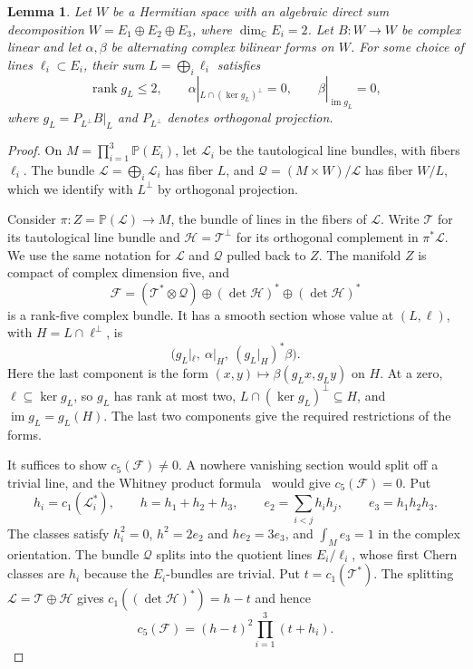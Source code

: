 \documentclass[11pt,letterpaper]{article}
\newtheorem{lemma}[theorem]{Lemma}
\newcommand{\C}{\mathbb C}
\newcommand{\rank}{\operatorname{rank}}
\begin{document}
\begin{lemma}\label{lem:selection}
Let \(W\) be a Hermitian space with an algebraic direct sum
decomposition \(W=E_1\oplus E_2\oplus E_3\), where
\(\dim_{\C}E_i=2\). Let \(B:W\to W\) be complex linear and
let \(\alpha,\beta\) be alternating complex bilinear forms on \(W\).
For some choice of lines \(\ell_i\subset E_i\), their sum
\(L=\bigoplus_i\ell_i\) satisfies
\[
\rank g_L\le2,\qquad
\alpha|_{L\cap(\ker g_L)^\perp}=0,\qquad
\beta|_{\operatorname{im}g_L}=0,
\]
where \(g_L=P_{L^\perp}B|_L\) and \(P_{L^\perp}\) denotes orthogonal
projection.
\end{lemma}

\begin{proof}
On \(M=\prod_{i=1}^3\mathbb P(E_i)\), let \(\mathcal L_i\) be the
tautological line bundles, with fibers \(\ell_i\). The bundle
\(\mathcal L=\bigoplus_i\mathcal L_i\) has fiber \(L\), and
\(\mathcal Q=(M\times W)/\mathcal L\) has fiber \(W/L\), which we
identify with \(L^\perp\) by orthogonal projection.

Consider \(\pi:Z=\mathbb P(\mathcal L)\to M\), the bundle of lines
in the fibers of \(\mathcal L\). Write \(\mathcal T\) for its
tautological line bundle and \(\mathcal H=\mathcal T^\perp\) for its
orthogonal complement in \(\pi^*\mathcal L\). We use the same notation
for \(\mathcal L\) and \(\mathcal Q\) pulled back to \(Z\).
The manifold \(Z\) is compact of complex dimension five, and
\[
\mathcal F=(\mathcal T^*\otimes\mathcal Q)
    \oplus (\det\mathcal H)^* \oplus (\det\mathcal H)^*
\]
is a rank-five complex bundle. It has a smooth section whose value
at \((L,\ell)\), with \(H=L\cap\ell^\perp\), is
\[
\bigl(g_L|_\ell,\ \alpha|_H,\ (g_L|_H)^*\beta\bigr).
\]
Here the last component is the form
\((x,y)\mapsto\beta(g_Lx,g_Ly)\) on \(H\).
At a zero, \(\ell\subseteq\ker g_L\), so \(g_L\) has rank at most two,
\(L\cap(\ker g_L)^\perp\subseteq H\), and
\(\operatorname{im}g_L=g_L(H)\). The last two components give the
required restrictions of the forms.

It suffices to show \(c_5(\mathcal F)\ne0\). A nowhere vanishing
section would split off a trivial line, and the Whitney product
formula~\cite{grothendieck} would give \(c_5(\mathcal F)=0\). Put
\[
h_i=c_1(\mathcal L_i^*),\qquad
h=h_1+h_2+h_3,\qquad e_2=\sum_{i<j}h_i h_j,\qquad e_3=h_1h_2h_3.
\]
The classes satisfy \(h_i^2=0\), \(h^2=2e_2\) and \(he_2=3e_3\),
and \(\int_M e_3=1\) in the complex orientation.
The bundle \(\mathcal Q\) splits into the quotient lines
\(E_i/\ell_i\), whose first Chern classes are \(h_i\) because
the \(E_i\)-bundles are trivial. Put \(t=c_1(\mathcal T^*)\).
The splitting \(\mathcal L=\mathcal T\oplus\mathcal H\)
gives \(c_1((\det\mathcal H)^*)=h-t\) and hence
\[
c_5(\mathcal F)=(h-t)^2\prod_{i=1}^3(t+h_i).
\]


\end{proof}
\end{document}

